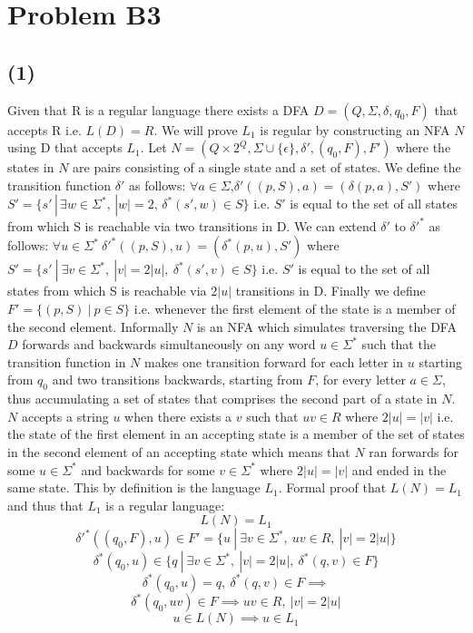 \documentclass[12pt]{article}
\begin{document}
\section*{Problem B3}
\subsection*{(1)}
  Given that R is a regular language there exists a DFA
  $D = (Q, \Sigma, \delta, q_0, F)$ that accepts R i.e. $L(D) = R$.
  We will prove $L_1$ is regular by constructing
  an NFA $N$ using D that accepts $L_1$. Let $N = (Q \times 2^Q,
  \Sigma \cup \{\epsilon\}, \delta{'}, (q_0 , F), F')$ where the states in $N$
  are pairs consisting of a single state and a set of states. We define the
  transition function $\delta{'}$ as follows:
  \newline
  \indent $\forall a \in \Sigma$,\:$\delta{'}((p,S), a) = (\delta(p,a), S')$ where
  $S'= \{s'\,|\,\exists w \in \Sigma^*,\,|w| = 2,\, \delta^*(s',w) \in S\}$
  \newline
  \indent i.e. $S'$ is equal to the set of all states from which S is reachable
  via two transitions in D.
  \newline
  We can extend $\delta{'}$ to $\delta{'}^*$ as follows:
  \newline
  \indent $\forall u \in \Sigma^*\: \delta{'}^* ((p,S),u) = (\delta^* (p, u),S')$
  where $S' = \{s'\:|\:\exists v \in \Sigma^* ,\: |v|=2|u| ,\:
  \delta^* (s', v) \in S\}$
  \newline
  \indent i.e. $S'$ is equal to the set of all states from which S is reachable
  via $2|u|$ transitions in D.
  \newline
  Finally we define $F' = \{(p, S) \:|\: p \in S\}$ i.e. whenever the first element
  of the state is a member of the second element. Informally $N$ is an NFA which
  simulates traversing the DFA $D$ forwards and backwards simultaneously on any
  word $u \in \Sigma^*$ such that the transition function in $N$ makes one
  transition forward for each letter in $u$ starting from $q_0$ and two
  transitions backwards, starting from $F$, for every letter $a \in \Sigma$, thus
  accumulating a set of states that comprises the second part of a state in $N$.
  $N$ accepts a string $u$ when there exists a $v$ such that $uv \in R$ where
  $2|u| = |v|$ i.e. the state of the first element in an accepting state
  is a member of the set of states in the second element of an accepting state
  which means that $N$ ran forwards for some $u \in \Sigma^*$ and backwards for
  some $v \in \Sigma^*$ where $2|u| = |v|$ and ended in the same state.
  This by definition is the language $L_1$. Formal proof that $L(N) = L_1$ and
  thus that $L_1$ is a regular language:
  $$ L(N) = L_1 $$
  $$ \delta{'}^*((q_0, F), u) \in F' = \{u \:|\: \exists v \in \Sigma^* ,\:
  uv \in R ,\: |v| = 2|u|\}$$ 
  $$ \delta^*(q_0, u) \in \{q \:|\: \exists v \in \Sigma^* ,\:
  |v| = 2|u| ,\: \delta^*(q,v) \in F\}$$
  $$ \delta^*(q_0, u) = q ,\: \delta^*(q,v) \in F \implies$$
  $$\delta^*(q_0, uv) \in F \implies uv \in R ,\: |v| = 2|u|$$
  $$ u \in L(N) \implies u \in L_1$$
\end{document}
